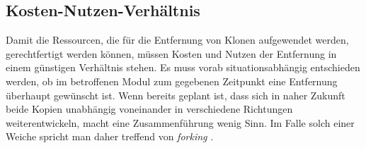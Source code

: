 \subsection{Kosten-Nutzen-Verhältnis}

Damit die Ressourcen, die für die Entfernung von Klonen aufgewendet werden, gerechtfertigt werden können, müssen Kosten und Nutzen der Entfernung in einem günstigen Verhältnis stehen. Es muss vorab situationsabhängig entschieden werden, ob im betroffenen Modul zum gegebenen Zeitpunkt eine Entfernung überhaupt gewünscht ist. Wenn bereits geplant ist, dass sich in naher Zukunft beide Kopien unabhängig voneinander in verschiedene Richtungen weiterentwickeln, macht eine Zusammenführung wenig Sinn. Im Falle solch einer Weiche spricht man daher treffend von \textit{forking} \cite{koschke2007survey}.
